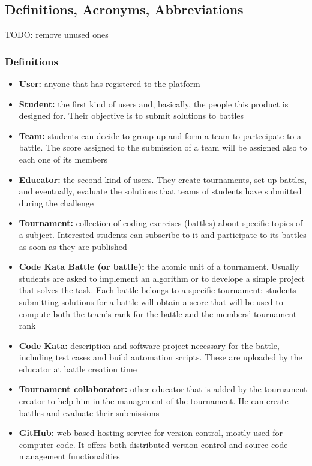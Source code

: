 \subsection{Definitions, Acronyms, Abbreviations}
TODO: remove unused ones
\subsubsection{Definitions}
\begin{itemize}
    \item {\textbf{User:} anyone that has registered to the platform}
    \item {\textbf{Student:} the first kind of users and, basically, the people this product is designed for. Their objective is to submit solutions to battles}
    \item {\textbf{Team:} students can decide to group up and form a team to partecipate to a battle. The score assigned to the submission of a team will be assigned also to each one of its members}
    \item {\textbf{Educator:} the second kind of users. They create tournaments, set-up battles, and eventually, evaluate the solutions that teams of students have submitted during the challenge}
    \item {\textbf{Tournament:} collection of coding exercises (battles) about specific topics of a subject. Interested students can subscribe to it and participate to its battles as soon as they are published}
    \item {\textbf{Code Kata Battle (or battle):} the atomic unit of a tournament. Usually students are asked to implement an algorithm or to develope a simple project that solves the task. Each battle belongs to a specific tournament: students submitting solutions for a battle will obtain a score that will be used to compute both the team's rank for the battle and the members' tournament rank}
    \item {\textbf{Code Kata:} description and software project necessary for the battle, including test cases and build automation scripts. These are uploaded by the educator at battle creation time}
    \item {\textbf{Tournament collaborator:} other educator that is added by the tournament creator to help him in the management of the tournament. He can create battles and evaluate their submissions}
    \item {\textbf{GitHub:} web-based hosting service for version control, mostly used for computer code. It offers both distributed version control and source code management functionalities}

\end{itemize}

